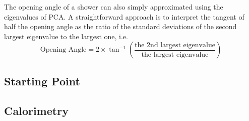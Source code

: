 The opening angle of a shower can also simply approximated using the
eigenvalues of PCA.
A straightforward approach is to interpret the tangent of half the 
opening angle as the ratio of the standard deviations of the second
largest eigenvalue to the largest one, i.e.
\begin{equation}
\label{eq:shropeningangle}
\textrm{Opening Angle} = 2\times \tan^{-1}({\frac{\textrm{the 2nd largest eigenvalue}}{\textrm{the largest eigenvalue}}})
\end{equation}

\subsection{Starting Point}
\label{sec:shrstartingpt}

\subsection{Calorimetry}


